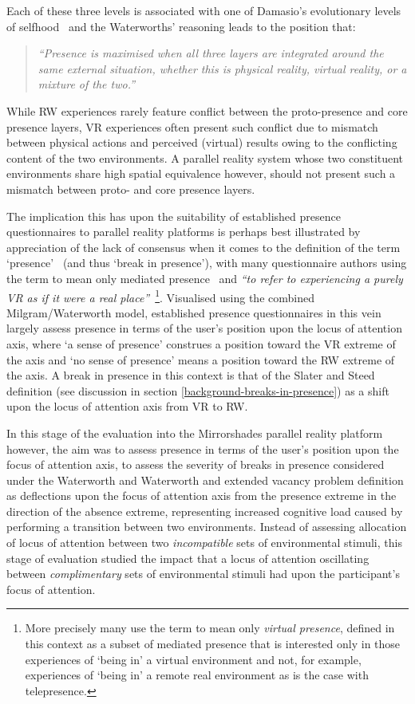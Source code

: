 Each of these three levels is associated with one of Damasio's evolutionary levels of selfhood~\cite{Damasio1999} and the Waterworths' reasoning leads to the position that:

\begin{quote}
\textit{``Presence is maximised when all three layers are integrated around the same external situation, whether this is physical reality, virtual reality, or a mixture of the two.''}~\cite{Mantovani2010}
\end{quote}

While RW experiences rarely feature conflict between the proto-presence and core presence layers, VR experiences often present such conflict due to mismatch between physical actions and perceived (virtual) results owing to the conflicting content of the two environments. A parallel reality system whose two constituent environments share high spatial equivalence however, should not present such a mismatch between proto- and core presence layers.

The implication this has upon the suitability of established presence questionnaires to parallel reality platforms is perhaps best illustrated by appreciation of the lack of consensus when it comes to the definition of the term `presence'~\cite{Calleja2014} (and thus `break in presence'), with many questionnaire authors using the term to mean only mediated presence~\cite{Mantovani2010} and \textit{``to refer to experiencing a purely VR as if it were a real place''}~\cite{Steed2014}\footnote{More precisely many use the term to mean only \textit{virtual presence}, defined in this context as a subset of mediated presence that is interested only in those experiences of `being in' a virtual environment and not, for example, experiences of `being in' a remote real environment as is the case with telepresence.}. Visualised using the combined Milgram/Waterworth model, established presence questionnaires in this vein largely assess presence in terms of the user's position upon the locus of attention axis, where `a sense of presence' construes a position toward the VR extreme of the axis and `no sense of presence' means a position toward the RW extreme of the axis. A break in presence in this context is that of the Slater and Steed definition (see discussion in section \ref{background-breaks-in-presence}) as a shift upon the locus of attention axis from VR to RW.

In this stage of the evaluation into the Mirrorshades parallel reality platform however, the aim was to assess presence in terms of the user's position upon the focus of attention axis, to assess the severity of breaks in presence considered under the Waterworth and Waterworth and extended vacancy problem definition as deflections upon the focus of attention axis from the presence extreme in the direction of the absence extreme, representing increased cognitive load caused by performing a transition between two environments. Instead of assessing allocation of locus of attention between two \textit{incompatible} sets of environmental stimuli, this stage of evaluation studied the impact that a locus of attention oscillating between \textit{complimentary} sets of environmental stimuli had upon the participant's focus of attention.

